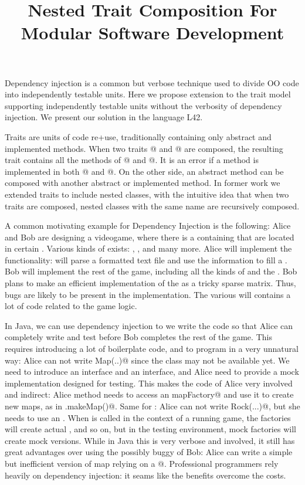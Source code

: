 \documentclass[a4paper,twoside,british,9pt]{extarticle}
\begin{document}
\title{Nested Trait Composition For Modular Software Development}
\date{}
\maketitle
\vspace{-10ex}
Dependency injection is a common but verbose technique
used to divide OO code into independently testable units.
Here we propose extension to the trait model
supporting independently testable units without
the verbosity of dependency injection.
We present our solution in the language L42.

Traits are units of code re+use, traditionally containing
only abstract and implemented methods.
When two traits @ and @ are composed, the resulting trait contains
all the methods of @ and @.
It is an error if a method \Q@m@ is implemented in both @ and @.
On the other side, an abstract method can be composed with
another abstract or implemented method.
In former work we extended traits to include nested classes, with the intuitive
idea that when two traits are composed, nested classes with the same name are recursively composed.


A common motivating example for Dependency Injection is the following:
Alice and Bob are designing a videogame, where there
is a \Q@Map@ containing \Q@Item@s that are located in certain
\Q@Point@s.
Various kinds of \Q@Item@s exists: \Q@Wall@s, \Q@Rock@s,
\Q@Tree@s and many more. Alice will implement the \Q@load@ functionality:
\Q@load@ will parse a formatted text file
and use the information to fill a \Q@Map@.
Bob will implement the rest of the game, 
including all the kinds of \Q@Item@s and
the \Q@Map@.
Bob plans to make an efficient implementation of the \Q@Map@ as a tricky
sparse matrix.
Thus, bugs are likely to be present in the \Q@Map@ implementation.
The various \Q@Item@s will contains a lot of code related to the game logic.

In Java, we can use dependency injection to we write the code so that Alice can 
completely write and test \Q@load@ before
Bob completes the rest of the game.
This requires introducing a lot of boilerplate code, and 
to program in a very unnatural way:
Alice can not write \Q@new Map(..)@
since the \Q@Map@ class may not be available yet.
We need to introduce an \Q@IMap@ interface and an \Q@IMapFactory@ interface,
and Alice need to provide
a mock implementation designed for testing.
This makes the code of Alice very involved and indirect:
Alice \Q@load@ method needs to access an \Q@IMapFactory mapFactory@
and use it to create new maps, as in \Q@mapFactory.makeMap()@.
Same for \Q@Item@s: Alice can not write \Q@new Rock(...)@,
but she needs to use an \Q@IItemFactory@.
When \Q@load@ is called in the context of a running game,
the factories will create actual \Q@Map@s, \Q@Rock@s
and so on, but in the testing environment, 
mock factories will create mock versions.
While in Java this is very verbose and involved,
it still has great advantages over using the
possibly buggy \Q@Map@ of Bob: Alice can 
write a simple but inefficient version of map relying
on a @.
Professional programmers rely heavily on dependency
injection: it seams like the benefits overcome the costs.
\end{document}
